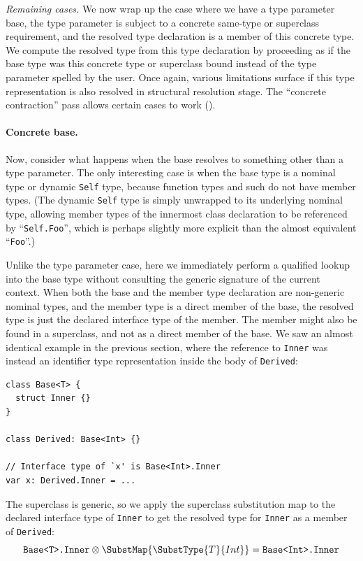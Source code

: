 \documentclass[../generics]{subfiles}
\begin{document}
\smallskip

\emph{Remaining cases.} We now wrap up the case where we have a type parameter base, the type parameter is subject to a concrete same-type or superclass requirement, and the resolved type declaration is a member of this concrete type. We compute the resolved type from this type declaration by proceeding as if the base type was this concrete type or superclass bound instead of the type parameter spelled by the user. Once again, various limitations surface if this type representation is also resolved in structural resolution stage. The ``concrete contraction'' pass allows certain cases to work ().

\paragraph{Concrete base.} Now, consider what happens when the base resolves to something other than a type parameter. The only interesting case is when the base type is a nominal type or dynamic \texttt{Self} type, because function types and such do not have member types. (The dynamic \texttt{Self} type is simply unwrapped to its underlying nominal type, allowing member types of the innermost class declaration to be referenced by ``\texttt{Self.Foo}'', which is perhaps slightly more explicit than the almost equivalent ``\texttt{Foo}''.)

Unlike the type parameter case, here we immediately perform a qualified lookup into the base type without consulting the generic signature of the current context. When both the base and the member type declaration are non-generic nominal types, and the member type is a direct member of the base, the resolved type is just the declared interface type of the member. The member might also be found in a superclass, and not as a direct member of the base. We saw an almost identical example in the previous section, where the reference to \texttt{Inner} was instead an identifier type representation inside the body of \texttt{Derived}:
\begin{Verbatim}
class Base<T> {
  struct Inner {}
}

class Derived: Base<Int> {}

// Interface type of `x' is Base<Int>.Inner
var x: Derived.Inner = ...
\end{Verbatim}
The superclass is generic, so we apply the superclass substitution map to the declared interface type of \texttt{Inner} to get the resolved type for \texttt{Inner} as a member of \texttt{Derived}:
\[\texttt{Base<T>.Inner}\otimes\SubstMap{\SubstType{T}{Int}}=\texttt{Base<Int>.Inner}\]
\end{document}
